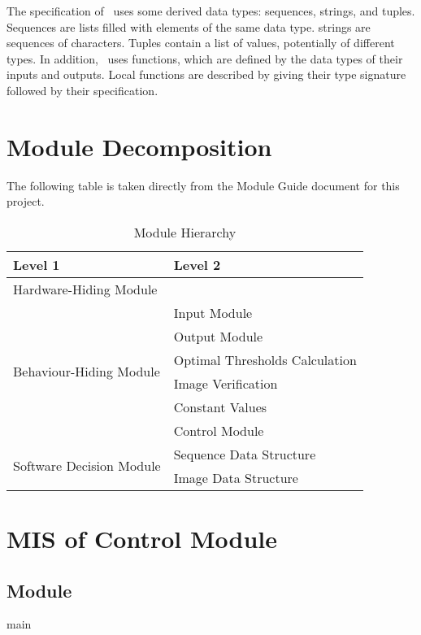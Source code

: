 \documentclass[12pt, titlepage]{article}
\begin{document}
\noindent
The specification of \progname \ uses some derived data types: sequences,
strings, and
tuples. Sequences are lists filled with elements of the same data type. strings
are sequences of characters. Tuples contain a list of values, potentially of
different types. In addition, \progname \ uses functions, which
are defined by the data types of their inputs and outputs. Local functions are
described by giving their type signature followed by their specification.

\section{Module Decomposition}

The following table is taken directly from the Module Guide document for this
project.

\begin{table}[h!]
\centering
\begin{tabular}{p{} p{}}
\toprule
\textbf{Level 1} & \textbf{Level 2}\\
\midrule

{Hardware-Hiding Module} & ~ \\
\midrule

\multirow{6}{0.3\textwidth}{Behaviour-Hiding Module}
& Input Module\\
& Output Module\\
& Optimal Thresholds Calculation\\
& Image Verification\\
& Constant Values\\
& Control Module\\
\midrule

\multirow{2}{0.3\textwidth}{Software Decision Module}
& Sequence Data Structure\\
& Image Data Structure\\
\bottomrule

\end{tabular}
\caption{Module Hierarchy}
\label{TblMH}
\end{table}

\newpage

\section{MIS of Control Module} \label{Md_Control}
\subsection{Module}
main
\end{document}
